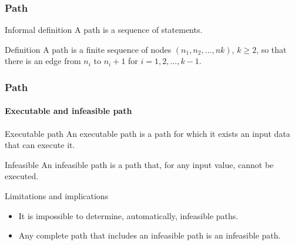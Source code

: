 \begin{frame}[parent={cmap:structural-software-testing},hasnext=true,hasprev=true]
\frametitle{Path}
\label{concept:path}

\begin{block:concept}{Informal definition}
A path is a sequence of statements.
\end{block:concept}

\begin{block:concept}{Definition}
A path is a finite sequence of nodes $(n_1, n_2, . . . , nk)$,
$k \geqslant 2$, so that there is an edge from $n_i$ to $n_i + 1$ for
$i = 1, 2, ... , k - 1$.
\end{block:concept}
\end{frame}


\begin{frame}
\frametitle{Path}
\framesubtitle{Executable and infeasible path}
\label{concept:infeasible-path}
\label{concept:missing-path}

\begin{block:concept}{Executable path}
An executable path is a path for which it exists an input data that can
execute it.
\end{block:concept}

\begin{block:concept}{Infeasible}
An infeasible path is a path that, for any input value, cannot be executed.
\end{block:concept}

\begin{block:fact}{Limitations and implications}
\begin{itemize}
	\item It is impossible to determine, automatically, infeasible paths.

	\item Any complete path that includes an infeasible path is an
	infeasible path.
\end{itemize}
\end{block:fact}

\hfill
{}
\end{frame}



